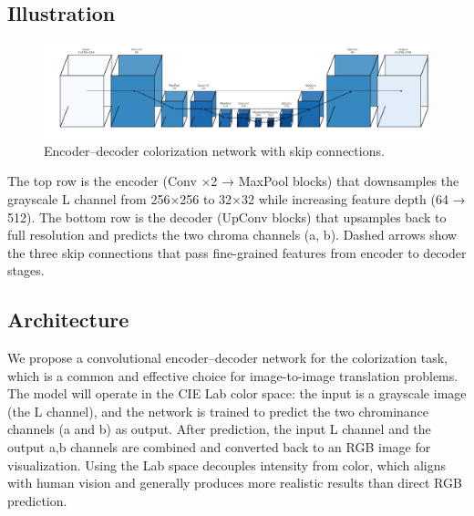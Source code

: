 \documentclass{article} %
\begin{document}
\subsection{Illustration}

\begin{figure}[htbp]            %
  \centering
  \includegraphics[width=0.9\linewidth]{Figs/architecture.png}
  \caption{Encoder–decoder colorization network with skip connections.}
  \label{fig:architecture}
\end{figure}

The top row is the encoder (Conv ×2 → MaxPool blocks) that downsamples the grayscale L channel from 256×256 to 32×32 while increasing feature depth (64 → 512).
The bottom row is the decoder (UpConv blocks) that upsamples back to full resolution and predicts the two chroma channels (a, b). Dashed arrows show the three skip connections that pass fine-grained features from encoder to decoder stages.

\subsection{Architecture}

We propose a convolutional encoder–decoder network for the colorization task, which is a common and effective choice for image-to-image translation problems. \cite{leatvanich2025image} The model will operate in the CIE Lab color space: the input is a grayscale image (the L channel), and the network is trained to predict the two chrominance channels (a and b) as output. After prediction, the input L channel and the output a,b channels are combined and converted back to an RGB image for visualization. Using the Lab space decouples intensity from color, which aligns with human vision and generally produces more realistic results than direct RGB prediction. \cite{leatvanich2025image}
\end{document}
